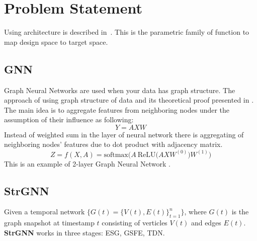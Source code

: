 \documentclass{article}
\begin{document}
\section{Problem Statement}
Using architecture is described in~\cite{DBLP:journals/corr/abs-2005-07427}. This is the parametric family of function to map design space to target space. 
\subsection{GNN}
Graph Neural Networks are used when your data has graph structure. The approach of using graph structure of data and its theoretical proof presented in \cite{DBLP:journals/corr/KipfW16}. The main idea is to aggregate features from neighboring nodes under the assumption of their influence as following:
\begin{equation}
    Y = AXW
\end{equation}
Instead of weighted sum in the layer of neural network there is aggregating of neighboring nodes' features due to dot product with adjacency matrix.
\begin{equation}
    Z = f(X,A) = \text{softmax}\big(A~\text{ReLU}\big(AXW^{(0)}\big)W^{(1)}\big)
\end{equation}
This is an example of 2-layer Graph Neural Network \cite{DBLP:journals/corr/KipfW16}.
\subsection{StrGNN}
Given a temporal network $\{G(t) = \{V(t), E(t)\}^n_{t=1}\}$, where $G(t)$ is the graph snapshot at timestamp $t$ consisting of verticles $V(t)$ and edges $E(t)$.\\ \textbf{StrGNN} works in three stages: ESG, GSFE, TDN.
\end{document}

